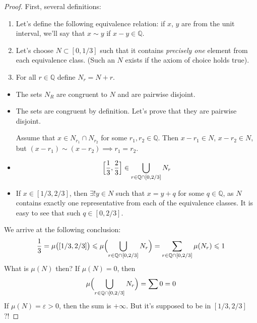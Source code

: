 \begin{proof}
    First, several definitions:
    \begin{enumerate}[label={Step \arabic*.}]
        \item {
            Let's define the following equivalence relation:
            if $x$, $y$ are from the unit interval, we'll say that
            $x \sim y$ if $x - y \in \mathbb{Q}$.
        }
        \item {
            Let's choose $N \subset [0, 1/3]$ such that it contains
            \textit{precisely one} element from each equivalence class.
            (Such an $N$ exists if the axiom of choice holds true).
        }
        \item {
            For all $r \in \mathbb{Q}$ define $N_r = N + r$.
        }
    \end{enumerate}

    \begin{itemize}%
        \item[Claim 1.] {
            The sets $N_R$ are congruent to $N$ and are pairwise disjoint.
        }
        \item[Proof.] {
            The sets are congruent by definition. Let's prove that 
            they are pairwise disjoint.

            Assume that $x \in N_{r_1} \cap N_{r_2}$ for some
            $r_1, r_2 \in \mathbb{Q}$.
            Then $x - r_1 \in N$, $x - r_2 \in N$, but
            $(x - r_1) \sim (x - r_2) \implies r_1 = r_2$.
        }
        \item[Claim 2.] {
            \[
                \Bigl[\frac{1}{3}, \frac{2}{3}\Bigr] \in
                \bigcup_{r \in \mathbb{Q} \cap [0, 2/3]} N_r
            \]
        }
        \item[Proof.] {
            If $x \in [1/3, 2/3]$, then
            $\exists! y \in N$ such that $x = y + q$ for some $q \in \mathbb{Q}$,
            as $N$ contains exactly one representative from each of the equivalence classes.
            It is easy to see that such $q \in [0, 2/3]$.
        }
    \end{itemize}

    We arrive at the following conclusion:
    \[
        \frac{1}{3} = \mu\bigl([1/3, 2/3]\bigr) \le \mu\Bigl( \bigcup_{r \in \mathbb{Q} \cap [0, 2/3]} N_r \Bigr) = 
        \sum_{r \in \mathbb{Q} \cap [0, 2/3]} \mu(N_r) \le 1
    \]
    What is $\mu(N)$ then? If $\mu(N) = 0$, then 
    \[
        \mu\Bigl( \bigcup_{r \in \mathbb{Q} \cap [0, 2/3]} N_r \Bigr) = 
        \sum 0 = 0
    \]
    If $\mu(N) = \varepsilon > 0$, then the sum is $+\infty$. 
    But it's supposed to be in $[1/3, 2/3]$?!
\end{proof}

